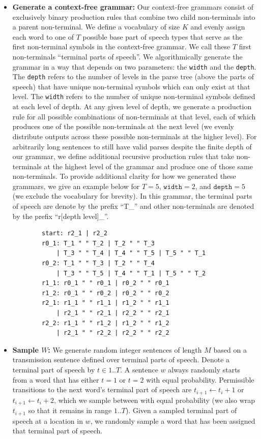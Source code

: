 \documentclass{article} %
\begin{document}
\begin{appendices}
\begin{itemize}
    \item \textbf{Generate a context-free grammar:}
    Our context-free grammars consist of exclusively binary production rules that combine two child non-terminals into a parent non-terminal. We define a vocabulary of size $K$ and evenly assign each word to one of $T$ possible base part of speech types that serve as the first non-terminal symbols in the context-free grammar. We call these $T$ first non-terminals ``terminal parts of speech''. We algorithmically generate the grammar in a way that depends on two parameters: the \texttt{width} and the \texttt{depth}. The \texttt{depth} refers to the number of levels in the parse tree (above the parts of speech) that have unique non-terminal symbols which can only exist at that level. The \texttt{width} refers to the number of unique non-terminal symbols defined at each level of depth. At any given level of depth, we generate a production rule for all possible combinations of non-terminals at that level, each of which produces one of the possible non-terminals at the next level (we evenly distribute outputs across these possible non-terminals at the higher level). For arbitrarily long sentences to still have valid parses despite the finite depth of our grammar, we define additional recursive production rules that take non-terminals at the highest level of the grammar and produce one of those same non-terminals. To provide additional clarity for how we generated these grammars, we give an example below for $T=5$, $\texttt{width}=2$, and $\texttt{depth}=5$ (we exclude the vocabulary for brevity). In this grammar, the terminal parts of speech are denote by the prefix ``T\_'' and other non-terminals are denoted by the prefix ``r[depth level]\_''.
    \begin{lstlisting}
        start: r2_1 | r2_2
        r0_1: T_1 " " T_2 | T_2 " " T_3 
            | T_3 " " T_4 | T_4 " " T_5 | T_5 " " T_1
        r0_2: T_1 " " T_3 | T_2 " " T_4 
            | T_3 " " T_5 | T_4 " " T_1 | T_5 " " T_2
        r1_1: r0_1 " " r0_1 | r0_2 " " r0_1
        r1_2: r0_1 " " r0_2 | r0_2 " " r0_2
        r2_1: r1_1 " " r1_1 | r1_2 " " r1_1 
            | r2_1 " " r2_1 | r2_2 " " r2_1
        r2_2: r1_1 " " r1_2 | r1_2 " " r1_2 
            | r2_1 " " r2_2 | r2_2 " " r2_2
    \end{lstlisting}
    
    \item \textbf{Sample $W$:}
    We generate random integer sentences of length $M$ based on a transmission sentence defined over terminal parts of speech. Denote a terminal part of speech by $t \in 1..T$. A sentence $w$ always randomly starts from a word that has either $t=1$ or $t=2$ with equal probability. Permissible transitions to the next word's terminal part of speech are $t_{i+1} \leftarrow t_i + 1$ or $t_{i+1} \leftarrow t_i + 2$, which we sample between with equal probability (we also wrap $t_{i+1}$ so that it remains in range $1..T$). Given a sampled terminal part of speech at a location in $w$, we randomly sample a word that has been assigned that terminal part of speech.
    

\end{itemize}
\end{appendices}
\end{document}
